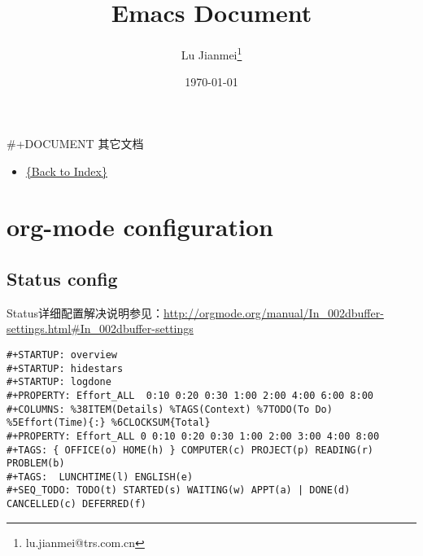 \documentclass[10pt,a4paper]{article}
\title{}
\author{Lu Jianmei\thanks{lu.jianmei@trs.com.cn}}
\date{\today}
\title{Emacs Document}
\begin{document}
\maketitle
\setcounter{tocdepth}{3}
\tableofcontents

\#+DOCUMENT 其它文档

\begin{itemize}
\item \href{../work-note-in-2015.org}{\{Back to Index\}}
\end{itemize}

\section{org-mode configuration}
\label{sec-1}
\subsection{Status config}
\label{sec-1-1}
Status详细配置解决说明参见：\url{http://orgmode.org/manual/In_002dbuffer-settings.html#In_002dbuffer-settings}
\begin{lstlisting}
#+STARTUP: overview
#+STARTUP: hidestars
#+STARTUP: logdone
#+PROPERTY: Effort_ALL  0:10 0:20 0:30 1:00 2:00 4:00 6:00 8:00
#+COLUMNS: %38ITEM(Details) %TAGS(Context) %7TODO(To Do) %5Effort(Time){:} %6CLOCKSUM{Total}
#+PROPERTY: Effort_ALL 0 0:10 0:20 0:30 1:00 2:00 3:00 4:00 8:00
#+TAGS: { OFFICE(o) HOME(h) } COMPUTER(c) PROJECT(p) READING(r) PROBLEM(b)
#+TAGS:  LUNCHTIME(l) ENGLISH(e)
#+SEQ_TODO: TODO(t) STARTED(s) WAITING(w) APPT(a) | DONE(d) CANCELLED(c) DEFERRED(f)
\end{lstlisting}
\end{document}
